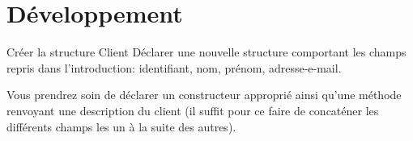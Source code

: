 \documentclass[a4paper,11pt]{article}
\begin{document}
\section{D\'eveloppement}
	
	
	
	

			

\vspace{0.3cm}







 	\begin{Exercice}{Créer la structure Client}
		D\'eclarer une nouvelle structure  comportant les champs repris dans l'introduction: identifiant, nom, prénom, adresse-e-mail.
		
		Vous prendrez soin de d\'eclarer un constructeur appropri\'e ainsi qu'une m\'ethode  renvoyant une description du client (il suffit pour ce faire de concat\'ener les diff\'erents champs les un \`a la suite des autres).
		
	\end{Exercice} 
\end{document}
